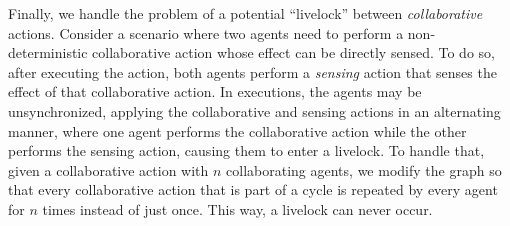 \documentclass[letterpaper]{article} %
\theoremstyle{definition}
\begin{document}
Finally, we handle the problem of a potential ``livelock'' between \emph{collaborative} actions. Consider a scenario where two agents need to perform a non-deterministic collaborative action whose effect can be directly sensed. To do so, after executing the action, both agents perform a \emph{sensing} action that senses the effect of that collaborative action.
In executions, the agents may be unsynchronized,  applying the collaborative and sensing actions in an alternating manner, where one agent performs the collaborative action while the other performs the sensing action, causing them to enter a livelock. To handle that, given a collaborative action with $n$ collaborating agents, we modify the graph so that every collaborative action that is part of a cycle is repeated by every agent for $n$ times instead of just once. This way, a livelock can never occur.
\end{document}
